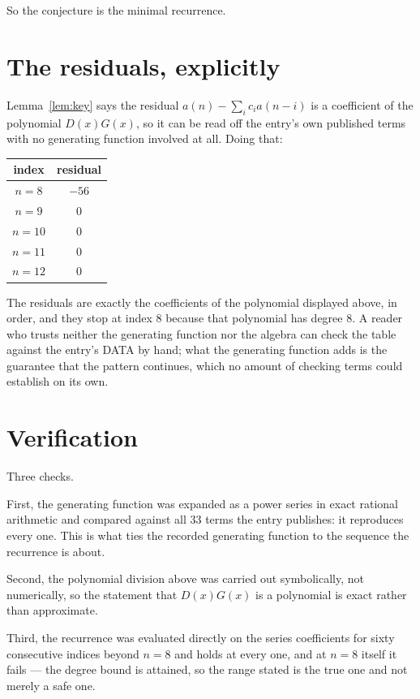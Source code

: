 \documentclass[11pt,a4paper]{article}
\theoremstyle{plain}
\theoremstyle{definition}
\begin{document}
So the conjecture is the minimal recurrence.

\section{The residuals, explicitly}

Lemma~\ref{lem:key} says the residual $a(n)-\sum_ic_ia(n-i)$ is a coefficient of the
polynomial $D(x)G(x)$, so it can be read off the entry's own published terms with no
generating function involved at all. Doing that:
\begin{center}
\begin{tabular}{cc}
index & residual \\ \hline
$n=8$ & $-56$ \\
$n=9$ & $0$ \\
$n=10$ & $0$ \\
$n=11$ & $0$ \\
$n=12$ & $0$
\end{tabular}
\end{center}
The residuals are exactly the coefficients of the polynomial displayed above, in order, and
they stop at index $8$ because that polynomial has degree $8$. A reader who trusts
neither the generating function nor the algebra can check the table against the entry's DATA
by hand; what the generating function adds is the guarantee that the pattern continues, which
no amount of checking terms could establish on its own.

\section{Verification}

Three checks.

First, the generating function was expanded as a power series in exact rational arithmetic and
compared against all $33$ terms the entry publishes: it reproduces every one. This is
what ties the recorded generating function to the sequence the recurrence is about.

Second, the polynomial division above was carried out symbolically, not numerically, so the
statement that $D(x)G(x)$ is a polynomial is exact rather than approximate.

Third, the recurrence was evaluated directly on the series coefficients for sixty consecutive
indices beyond $n=8$ and holds at every one, and at $n=8$ itself it fails --- the
degree bound is attained, so the range stated is the true one and not merely a safe one.
\end{document}
